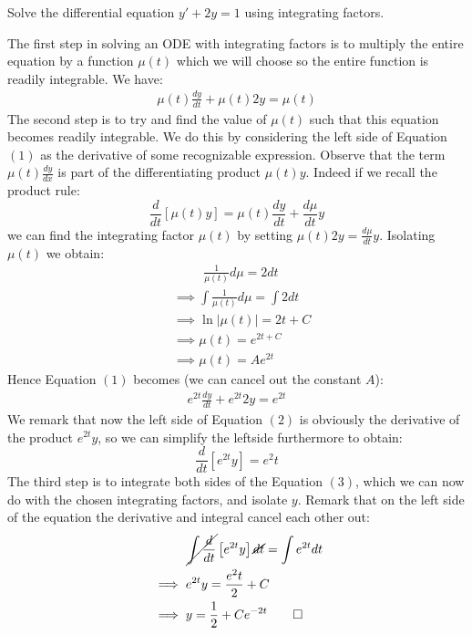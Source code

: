 \begin{example}
    Solve the differential equation $y' + 2y = 1$ using integrating factors.
\end{example}
\begin{solution}
    The first step in solving an ODE with integrating factors is to multiply the entire equation by a function $\mu(t)$ which we will choose so the entire function is readily integrable. We have:
    \begin{align}
        \mu(t)\frac{dy}{dt} + \mu(t)2y = \mu(t)
    \end{align}
    The second step is to try and find the value of $\mu(t)$ such that this equation becomes readily integrable. We do this by considering the left side of Equation $(1)$ as the derivative of some recognizable expression. Observe that the term $\mu(t)\frac{dy}{dx}$ is part of the differentiating product $\mu(t)y$. Indeed if we recall the product rule: 
    \[\frac{d}{dt}\left[\mu(t)y\right] = \mu(t)\frac{dy}{dt} + \frac{d\mu}{dt}y\]
    we can find the integrating factor $\mu(t)$ by setting $\mu(t)2y = \frac{d\mu}{dt}y$. Isolating $\mu(t)$ we obtain:
    \begin{align*}
        &\hspace{1cm} \frac{1}{\mu(t)}d\mu = 2 dt \\
        &\implies \int \frac{1}{\mu(t)}d\mu = \int 2 dt \\
        &\implies \ln|\mu(t)| = 2t + C \\
        &\implies \mu(t) = e^{2t + C} \\
        &\implies \mu(t) = Ae^{2t}
    \end{align*}
    Hence Equation $(1)$ becomes (we can cancel out the constant $A$):
    \begin{align}
        e^{2t}\frac{dy}{dt} + e^{2t}2y = e^{2t}    
    \end{align}
    We remark that now the left side of Equation $(2)$ is obviously the derivative of the product $e^{2t}y$, so we can simplify the leftside furthermore to obtain:
    \[\frac{d}{dt}\left[e^{2t}y\right] = e^2t\]
    The third step is to integrate both sides of the Equation $(3)$, which we can now do with the chosen integrating factors, and isolate $y$. Remark that on the left side of the equation the derivative and integral cancel each other out:
    \begin{align*}
    &\hspace{1cm} \cancel{\int \frac{d}{dt}}\left[e^{2t}y\right] \cancel{dt} = \int e^{2t} dt \\
    &\implies e^{2t}y = \frac{e^2t}{2} + C \\
    &\implies y = \frac{1}{2} + Ce^{-2t} \qedhere
    \end{align*}
\end{solution}

